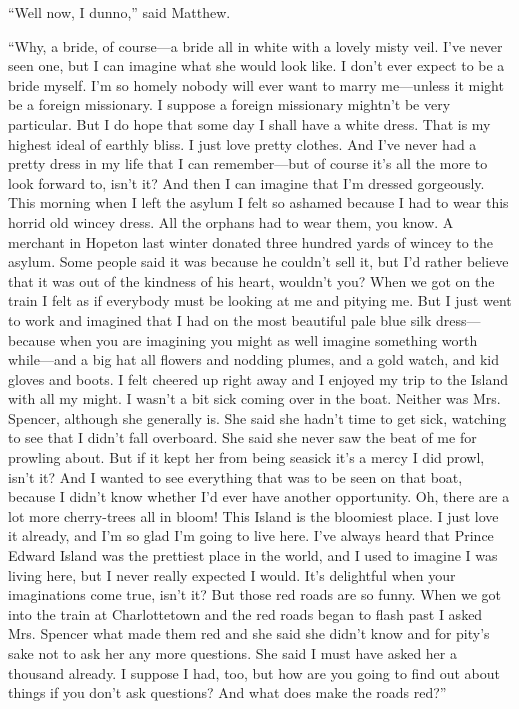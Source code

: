 \documentclass{article}
\begin{document}
``Well now, I dunno,'' said Matthew.

``Why, a bride, of course---a bride all in white with a lovely misty veil. I've never seen one, but I can imagine what she would look like. I don't ever expect to be a bride myself. I'm so homely nobody will ever want to marry me---unless it might be a foreign missionary. I suppose a foreign missionary mightn't be very particular. But I do hope that some day I shall have a white dress. That is my highest ideal of earthly bliss. I just love pretty clothes. And I've never had a pretty dress in my life that I can remember---but of course it's all the more to look forward to, isn't it? And then I can imagine that I'm dressed gorgeously. This morning when I left the asylum I felt so ashamed because I had to wear this horrid old wincey dress. All the orphans had to wear them, you know. A merchant in Hopeton last winter donated three hundred yards of wincey to the asylum. Some people said it was because he couldn't sell it, but I'd rather believe that it was out of the kindness of his heart, wouldn't you? When we got on the train I felt as if everybody must be looking at me and pitying me. But I just went to work and imagined that I had on the most beautiful pale blue silk dress---because when you are imagining you might as well imagine something worth while---and a big hat all flowers and nodding plumes, and a gold watch, and kid gloves and boots. I felt cheered up right away and I enjoyed my trip to the Island with all my might. I wasn't a bit sick coming over in the boat. Neither was Mrs. Spencer, although she generally is. She said she hadn't time to get sick, watching to see that I didn't fall overboard. She said she never saw the beat of me for prowling about. But if it kept her from being seasick it's a mercy I did prowl, isn't it? And I wanted to see everything that was to be seen on that boat, because I didn't know whether I'd ever have another opportunity. Oh, there are a lot more cherry-trees all in bloom! This Island is the bloomiest place. I just love it already, and I'm so glad I'm going to live here. I've always heard that Prince Edward Island was the prettiest place in the world, and I used to imagine I was living here, but I never really expected I would. It's delightful when your imaginations come true, isn't it? But those red roads are so funny. When we got into the train at Charlottetown and the red roads began to flash past I asked Mrs. Spencer what made them red and she said she didn't know and for pity's sake not to ask her any more questions. She said I must have asked her a thousand already. I suppose I had, too, but how are you going to find out about things if you don't ask questions? And what does make the roads red?''
\end{document}
